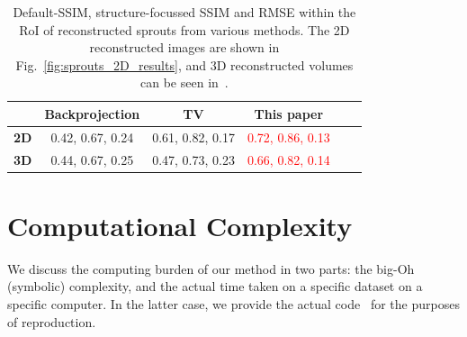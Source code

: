\documentclass[journal]{IEEEtran}
\begin{document}
\begin{table}[!h]
  \centering
  \caption{Default-SSIM, structure-focussed SSIM and RMSE within the RoI of reconstructed sprouts from various
    methods. 
The 2D reconstructed images are shown in Fig.~\ref{fig:sprouts_2D_results}, and 3D reconstructed volumes can be seen in~\cite{supp_paper}.}
\begin{tabular}{|l|c|c|c|c|c|}
\hline &
\textbf{Backprojection} & \textbf{TV} & \textbf{This paper}
 \\ \hline \textbf{2D} & 0.42, 0.67, 0.24
& 0.61, 0.82, 0.17 & \textcolor{red}{0.72, 0.86, 0.13} \\ \hline \textbf{3D} & 0.44, 0.67, 0.25 & 0.47, 0.73, 0.23 & \textcolor{red}{0.66, 0.82, 0.14}
\\ \hline
\end{tabular}
\label{table:sprouts_ssim}
\end{table}



\section{Computational Complexity}
\label{sec:discussion}

We discuss the computing burden of our method in two parts: the big-Oh
(symbolic) complexity, and the actual time taken on a specific dataset
on a specific computer. In the latter case, we provide the actual
code~\cite{codeRepo} for the purposes of reproduction. 
\end{document}
